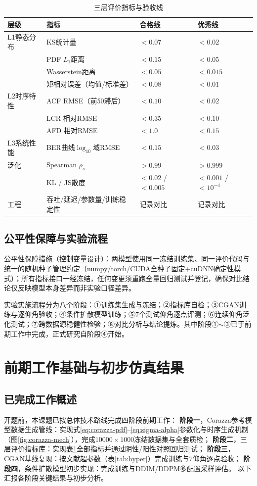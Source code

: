 \documentclass[12pt, a4paper]{ctexart}
\begin{document}
\begin{table}[H]
\centering\small
\caption{三层评价指标与验收线}
\label{tab:accept}
\begin{tabular}{llll}
\toprule
层级 & 指标 & 合格线 & 优秀线\\
\midrule
L1静态分布 & KS统计量 & $<0.07$ & $<0.02$\\
 & PDF $L_1$距离 & $<0.15$ & $<0.05$\\
 & Wasserstein距离 & $<0.05$ & $<0.015$\\
 & 矩相对误差（均值/标准差） & $<0.08$ & $<0.01$\\
L2时序特性 & ACF RMSE（前50滞后） & $<0.10$ & $<0.02$\\
 & LCR 相对RMSE & $<0.35$ & $<0.10$\\
 & AFD 相对RMSE & $<1.0$ & $<0.15$\\
L3系统性能 & BER曲线$\log_{10}$域RMSE & $<0.15$ & $<0.03$\\
泛化 & Spearman $\rho_s$ & $>0.99$ & $>0.999$\\
 & KL / JS散度 & $<0.02$ / $<0.005$ & $<0.001$ / $<10^{-4}$\\
工程 & 吞吐/延迟/参数量/训练稳定性 & 记录对比 & 记录对比\\
\bottomrule
\end{tabular}
\end{table}

\subsection{公平性保障与实验流程}
公平性保障措施（控制变量设计）：两模型使用同一冻结训练集、同一评价代码与统一的随机种子管理约定（numpy/torch/CUDA全种子固定+cuDNN确定性模式）；所有指标接口一经冻结，任何变更须重跑全量回归测试并登记，确保对比结论仅反映模型本身差异而非实验口径差异。

实验实施流程分为八个阶段：①训练集生成与冻结；②指标库自检；③CGAN训练与逐仰角验收；④条件扩散模型训练；⑤7个测试仰角逐点评测；⑥连续仰角泛化测试；⑦跨数据源稳健性检验；⑧对比分析与结论提炼。其中阶段①$\sim$③已于前期工作中完成，正式研究自阶段④开始。

\section{前期工作基础与初步仿真结果}

\subsection{已完成工作概述}
开题前，本课题已按总体技术路线完成四阶段前期工作：
\textbf{阶段一}，Corazza参考模型数据生成管线：实现式\eqref{eq:corazza-pdf}--\eqref{eq:sigma-alpha}参数化与时序生成机制（图\ref{fig:corazza-mech}），完成$10000\times1000$冻结数据集与全套质检；
\textbf{阶段二}，三层评价指标库：实现表\ref{tab:accept}全部指标并通过阴性/阳性对照回归测试；
\textbf{阶段三}，CGAN基线复现：按文献\cite{chen2026cgan}超参数（表\ref{tab:hyper}）完成训练与7仰角逐点验收；
\textbf{阶段四}，条件扩散模型初步实现：完成训练与DDIM/DDPM多配置采样评估。
以下汇报各阶段关键结果与初步分析。
\end{document}
